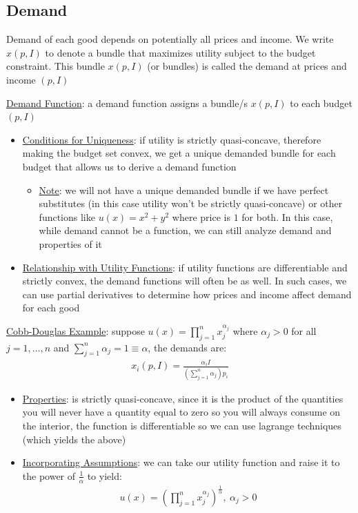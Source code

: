 \documentclass{article}
\begin{document}
\subsection{Demand}
Demand of each good depends on potentially all prices and income. We write $x(p,I)$ to denote a bundle that maximizes utility subject to the budget constraint. This bundle $x(p,I)$ (or bundles) is called the demand at prices and income $(p, I)$  \par \vspace{0.3em}
  \underline{Demand Function}: a demand function assigns a bundle/s $x(p, I)$ to each budget $(p,I)$
  \begin{itemize}
    \item  \underline{Conditions for Uniqueness}: if utility is strictly quasi-concave, therefore making the budget set convex, we get a unique demanded bundle for each budget that allows us to derive a demand function
    \begin{itemize}
      \item  \underline{Note}: we will not have a unique demanded bundle if we have perfect substitutes (in this case utility won't be strictly quasi-concave) or other functions like $u(x) = x^{2} + y^{2}$ where price is $1$ for both. In this case, while demand cannot be a function, we can still analyze demand and properties of it
    \end{itemize}
    \item  \underline{Relationship with Utility Functions}: if utility functions are differentiable and strictly convex, the demand functions will often be as well. In such cases, we can use partial derivatives to determine how prices and income affect demand for each good
  \end{itemize}
  \par
  \underline{Cobb-Douglas Example}: suppose $u(x) = \prod_{j=1}^{n} x_{j}^{\alpha_{j}}$ where $\alpha_{j} > 0$ for all $j = 1, \dots, n$ and $\sum_{j=1}^{n} \alpha_{j} = 1 \equiv \alpha$, the demands are:
  \begin{gather*}
    x_{i}(p,I) = \frac{\alpha_{i} I}{(\sum_{j=1}^{n}\alpha_{j})p_{i}}
  \end{gather*}
  \par
  \begin{itemize}
    \item  \underline{Properties}: is strictly quasi-concave, since it is the product of the quantities you will never have a quantity equal to zero so you will always consume on the interior, the function is differentiable so we can use lagrange techniques (which yields the above)
    \item  \underline{Incorporating Assumptions}: we can take our utility function and raise it to the power of $\tfrac{1}{\alpha}$ to yield:
    \begin{gather*}
      u(x) = (\prod_{j=1}^{n} x_{j}^{\alpha_{j}})^{\tfrac{1}{\alpha}}, \ \alpha_{j} > 0
    \end{gather*}
  \end{itemize}
\end{document}
